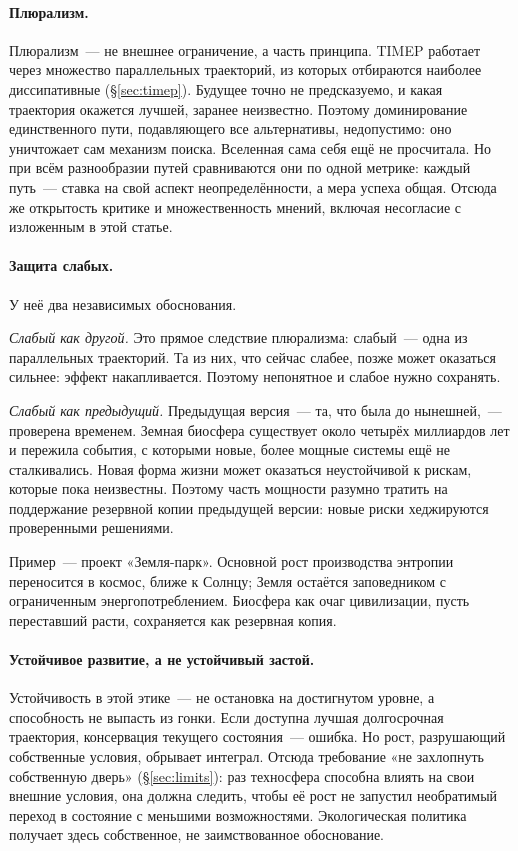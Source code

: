 \documentclass[11pt,a4paper]{article}
\newcommand{\Sref}[1]{\hyperref[#1]{\S\ref{#1}}}
\begin{document}
\paragraph{Плюрализм.}
Плюрализм~--- не внешнее ограничение, а часть принципа. TIMEP работает через множество параллельных траекторий, из которых отбираются наиболее диссипативные (\Sref{sec:timep}). Будущее точно не предсказуемо, и какая траектория окажется лучшей, заранее неизвестно. Поэтому доминирование единственного пути, подавляющего все альтернативы, недопустимо: оно уничтожает сам механизм поиска. Вселенная сама себя ещё не просчитала. Но при всём разнообразии путей сравниваются они по одной метрике: каждый путь~--- ставка на свой аспект неопределённости, а мера успеха общая. Отсюда же открытость критике и множественность мнений, включая несогласие с изложенным в этой статье.

\paragraph{Защита слабых.}
У неё два независимых обоснования.

\emph{Слабый как другой.} Это прямое следствие плюрализма: слабый~--- одна из параллельных траекторий. Та из них, что сейчас слабее, позже может оказаться сильнее: эффект накапливается. Поэтому непонятное и слабое нужно сохранять.

\emph{Слабый как предыдущий.} Предыдущая версия~--- та, что была до нынешней,~--- проверена временем. Земная биосфера существует около четырёх миллиардов лет и пережила события, с которыми новые, более мощные системы ещё не сталкивались. Новая форма жизни может оказаться неустойчивой к рискам, которые пока неизвестны. Поэтому часть мощности разумно тратить на поддержание резервной копии предыдущей версии: новые риски хеджируются проверенными решениями.

Пример~--- проект «Земля-парк». Основной рост производства энтропии переносится в космос, ближе к Солнцу; Земля остаётся заповедником с ограниченным энергопотреблением. Биосфера как очаг цивилизации, пусть переставший расти, сохраняется как резервная копия.

\paragraph{Устойчивое развитие, а не устойчивый застой.}
Устойчивость в этой этике~--- не остановка на достигнутом уровне, а способность не выпасть из гонки. Если доступна лучшая долгосрочная траектория, консервация текущего состояния~--- ошибка. Но рост, разрушающий собственные условия, обрывает интеграл. Отсюда требование «не захлопнуть собственную дверь» (\Sref{sec:limits}): раз техносфера способна влиять на свои внешние условия, она должна следить, чтобы её рост не запустил необратимый переход в состояние с меньшими возможностями. Экологическая политика получает здесь собственное, не заимствованное обоснование.
\end{document}
